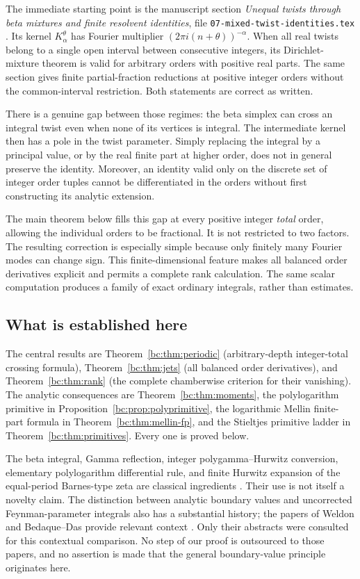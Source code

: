\documentclass[11pt,letterpaper]{article}
\numberwithin{equation}{section}
\theoremstyle{definition}
\theoremstyle{remark}
\begin{document}
The immediate starting point is the manuscript section
\emph{Unequal twists through beta mixtures and finite resolvent identities},
file \texttt{07-mixed-twist-identities.tex} \cite{repo-mixed}. Its kernel
$K_\alpha^\theta$ has Fourier multiplier $(2\pi i(n+\theta))^{-\alpha}$.
When all real twists belong to a single open interval between consecutive
integers, its Dirichlet-mixture theorem is valid for arbitrary orders with
positive real parts. The same section gives finite partial-fraction
reductions at positive integer orders without the common-interval
restriction. Both statements are correct as written.

There is a genuine gap between those regimes: the beta simplex can cross
an integral twist even when none of its vertices is integral. The
intermediate kernel then has a pole in the twist parameter. Simply
replacing the integral by a principal value, or by the real finite part at
higher order, does not in general preserve the identity. Moreover, an
identity valid only on the discrete set of integer order tuples cannot be
differentiated in the orders without first constructing its analytic
extension.

The main theorem below fills this gap at every positive integer
\emph{total} order, allowing the individual orders to be fractional. It is
not restricted to two factors. The resulting correction is especially
simple because only finitely many Fourier modes can change sign. This
finite-dimensional feature makes all balanced order derivatives explicit
and permits a complete rank calculation. The same scalar computation
produces a family of exact ordinary integrals, rather than estimates.

\subsection{What is established here}

The central results are Theorem~\ref{bc:thm:periodic} (arbitrary-depth
integer-total crossing formula), Theorem~\ref{bc:thm:jets} (all balanced
order derivatives), and Theorem~\ref{bc:thm:rank} (the complete
chamberwise criterion for their vanishing). The analytic consequences are
Theorem~\ref{bc:thm:moments}, the polylogarithm primitive in
Proposition~\ref{bc:prop:polyprimitive}, the logarithmic Mellin finite-part
formula in Theorem~\ref{bc:thm:mellin-fp}, and the Stieltjes primitive ladder
in Theorem~\ref{bc:thm:primitives}. Every one is proved below.

The beta integral, Gamma reflection, integer polygamma--Hurwitz
conversion, elementary polylogarithm differential rule, and finite
Hurwitz expansion of the equal-period Barnes-type zeta are classical
ingredients \cite{dlmf-beta,dlmf-gamma,dlmf-polygamma,dlmf-polylog,dlmf-hurwitz}.
Their use is not itself a novelty claim. The distinction between analytic
boundary values and uncorrected Feynman-parameter integrals also has a
substantial history; the papers of Weldon and Bedaque--Das provide relevant
context \cite{weldon,bedaque-das}. Only their abstracts were consulted for
this contextual comparison. No step of our proof is outsourced to those
papers, and no assertion is made that the general boundary-value principle
originates here.
\end{document}
